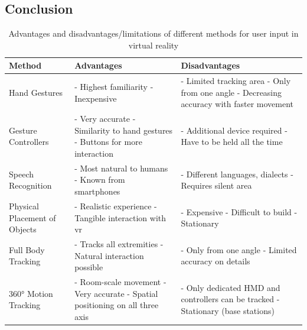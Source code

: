 
\subsection{Conclusion}

\begin{table}[b]
	\begin{center}
		\begin{tabular}{ | p{3.7cm} | p{4.9cm} | p{4.9cm} | } 
			\hline
			\textbf{Method} & \textbf{Advantages} & \textbf{Disadvantages} \\
			\hline
			Hand Gestures & 
			- Highest familiarity \newline - Inexpensive & 
			- Limited tracking area \newline - Only from one angle \newline - Decreasing accuracy with faster movement  \\
			\hline
			Gesture Controllers &
			- Very accurate \newline - Similarity to hand gestures \newline - Buttons for more interaction &
			- Additional device required \newline - Have to be held all the time \\
			\hline
			Speech Recognition &
			- Most natural to humans \newline - Known from smartphones &
			- Different languages, dialects \newline - Requires silent area \\ 
			\hline
			Physical Placement of Objects &
			- Realistic experience \newline - Tangible interaction with \gls{vr} &
			- Expensive \newline - Difficult to build \newline - Stationary \\ 
			\hline
			Full Body Tracking &
			- Tracks all extremities \newline - Natural interaction possible &
			- Only from one angle \newline - Limited accuracy on details \\ 
			\hline
			360° Motion Tracking &
			- Room-scale movement \newline - Very accurate \newline - Spatial positioning on all three axis &
			- Only dedicated HMD and controllers can be tracked \newline - Stationary (base stations) \\ 
			\hline
		\end{tabular}
		\caption{Advantages and disadvantages/limitations of different methods for user input in virtual reality}
		\label{tbl:methodscomparison}
	\end{center}
\end{table}

